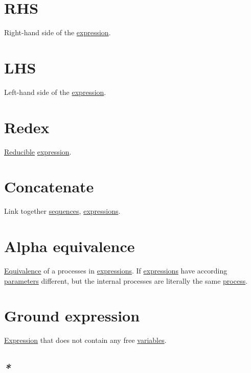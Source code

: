 \documentclass[a4paper,14pt,oneside]{book}
\begin{document}
\section{\label{orgd40f491}RHS}
\label{sec:orga39e12d}
Right-hand side of the \hyperref[orgc25ca10]{expression}.\\

\section{\label{org0579c3b}LHS}
\label{sec:orgfca5ab0}
Left-hand side of the \hyperref[orgc25ca10]{expression}.\\

\section{\label{org7964786}Redex}
\label{sec:org7d0f5aa}
\hyperref[orgb7a076e]{Reducible} \hyperref[orgc25ca10]{expression}.\\

\section{\label{org37a7bb2}Concatenate}
\label{sec:orgdd141c7}
Link together \hyperref[org4f333a5]{sequences}, \hyperref[org99613d8]{expressions}.\\

\section{\label{org060cc7d}Alpha equivalence}
\label{sec:orgf7a2a0b}
\hyperref[org0420335]{Equivalence} of a processes in \hyperref[org99613d8]{expressions}. If \hyperref[org99613d8]{expressions} have according \hyperref[org0e6473d]{parameters} different, but the internal processes are literally the same \hyperref[orgc8d4f36]{process}.\\

\section{\label{orgbb9ad9b}Ground expression}
\label{sec:orgda1a638}
\hyperref[orgc25ca10]{Expression} that does not contain any free \hyperref[org03ce465]{variables}.\\

\subsection{\emph{*}}
\label{sec:org2cec83c}
\end{document}
